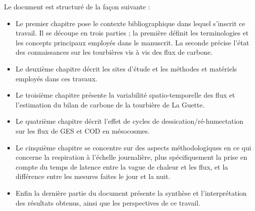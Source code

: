 
Le document est structuré de la façon suivante :
\begin{itemize}
\item Le premier chapitre pose le contexte bibliographique dans lequel s'inscrit ce travail.
Il se découpe en trois parties ; la première définit les terminologies et les concepts principaux employés dans le manuscrit.
La seconde précise l'état des connaissances sur les tourbières vis à vis des flux de carbone.
\item Le deuxième chapitre décrit les sites d'étude et les méthodes et matériels employés dans ces travaux.
\item Le troisième chapitre présente la variabilité spatio-temporelle des flux et l'estimation du bilan de carbone de la tourbière de La Guette.
\item Le quatrième chapitre décrit l'effet de cycles de dessication/ré-humectation sur les flux de GES et COD en mésocosmes.
\item Le cinquième chapitre se concentre sur des aspects méthodologiques en ce qui concerne la respiration à l'échelle journalière, plus spécifiquement la prise en compte du temps de latence entre la vague de chaleur et les flux, et la différence entre les mesures faites le jour et la nuit.
\item Enfin la dernière partie du document présente la synthèse et l'interprétation des résultats obtenus, ainsi que les perspectives de ce travail.
\end{itemize}

